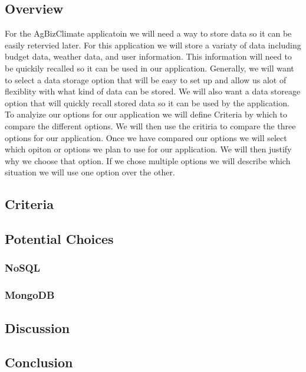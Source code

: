 \documentclass[letterpaper,10pt]{article}
\begin{document}
	\subsection{Overview}
		For the AgBizClimate applicatoin we will need a way to store data so it can be easily retervied later. For this application we will store a variaty of data including budget data, weather data, and user information. This information will need to be quickily recalled so it can be used in our application. Generally, we will want to select a data storage option that will be easy to set up and allow us alot of flexiblity with what kind of data can be stored. We will also want a data storeage option that will quickly recall stored data so it can be used by the application.\\
		To analyize our options for our application we will define Criteria by which to compare the different options. We will then use the critiria to compare the three options for our application. Once we have compared our options we will select which opiton or options we plan to use for our application. We will then justify why we choose that option. If we chose multiple options we will describe which situation we will use one option over the other.
		
	\subsection{Criteria}
	\subsection{Potential Choices}
		\subsubsection{NoSQL}
		
		\subsubsection{MongoDB}
		
		\subsubsection{}
		
	\subsection{Discussion}
	
	\subsection{Conclusion}
	
\end{document}
